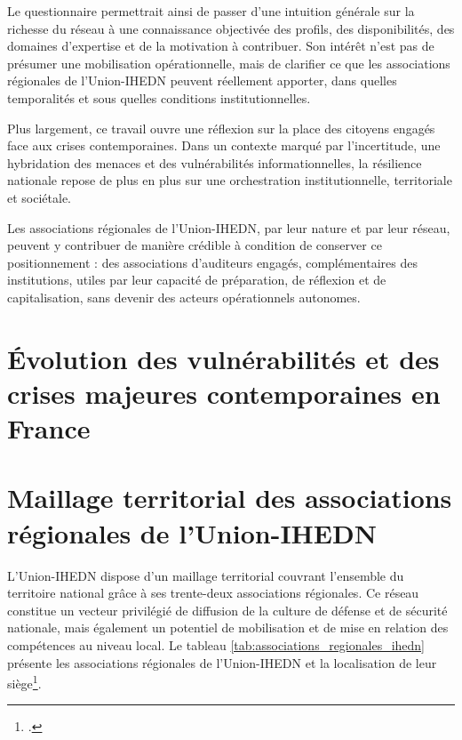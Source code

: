 \documentclass[12pt,a4paper]{article}
\newcommand{\UnionIHEDN}{Union-IHEDN}
\newcommand{\AssociationsRegionalesIHEDN}{associations régionales de l'\UnionIHEDN}
\begin{document}
Le questionnaire permettrait ainsi de passer d'une intuition générale sur la richesse du réseau à une connaissance objectivée des profils, des disponibilités, des domaines d'expertise et de la motivation à contribuer. Son intérêt n'est pas de présumer une mobilisation opérationnelle, mais de clarifier ce que les \AssociationsRegionalesIHEDN{} peuvent réellement apporter, dans quelles temporalités et sous quelles conditions institutionnelles.

Plus largement, ce travail ouvre une réflexion sur la place des citoyens engagés face aux crises contemporaines. Dans un contexte marqué par l'incertitude, une hybridation des menaces et des vulnérabilités informationnelles, la résilience nationale repose de plus en plus sur une orchestration institutionnelle, territoriale et sociétale.

Les \AssociationsRegionalesIHEDN{}, par leur nature et par leur réseau, peuvent y contribuer de manière crédible à condition de conserver ce positionnement : des associations d'auditeurs engagés, complémentaires des institutions, utiles par leur capacité de préparation, de réflexion et de capitalisation, sans devenir des acteurs opérationnels autonomes.

\clearpage

\appendix

\section{Évolution des vulnérabilités et des crises majeures contemporaines en France}
\label{annexe:tableau_crises_majeures}




\clearpage

\section{Maillage territorial des \AssociationsRegionalesIHEDN}
\label{annexe:maillage_territorial_ihedn}

L'\UnionIHEDN{} dispose d'un maillage territorial couvrant l'ensemble du territoire national grâce à ses trente-deux associations régionales. Ce réseau constitue un vecteur privilégié de diffusion de la culture de défense et de sécurité nationale, mais également un potentiel de mobilisation et de mise en relation des compétences au niveau local. Le tableau \ref{tab:associations_regionales_ihedn} présente les \AssociationsRegionalesIHEDN{} et la localisation de leur siège\footcite{ihedn_associations}.
\end{document}
